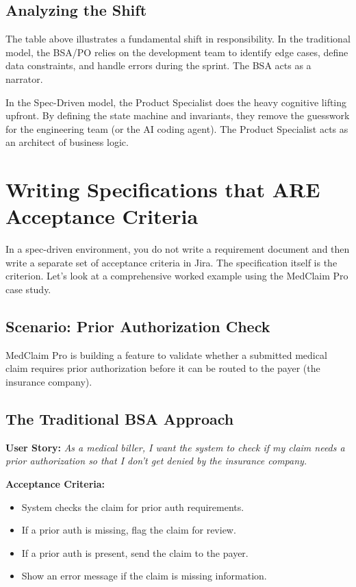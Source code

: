 \subsection{Analyzing the Shift}\label{analyzing-the-shift}

The table above illustrates a fundamental shift in responsibility. In
the traditional model, the BSA/PO relies on the development team to
identify edge cases, define data constraints, and handle errors during
the sprint. The BSA acts as a narrator.

In the Spec-Driven model, the Product Specialist does the heavy
cognitive lifting upfront. By defining the state machine and invariants,
they remove the guesswork for the engineering team (or the AI coding
agent). The Product Specialist acts as an architect of business logic.

\section{Writing Specifications that ARE Acceptance
Criteria}\label{writing-specifications-that-are-acceptance-criteria}

In a spec-driven environment, you do not write a requirement document
and then write a separate set of acceptance criteria in Jira. The
specification itself is the criterion. Let's look at a comprehensive
worked example using the MedClaim Pro case study.

\subsection{Scenario: Prior Authorization
Check}\label{scenario-prior-authorization-check}

MedClaim Pro is building a feature to validate whether a submitted
medical claim requires prior authorization before it can be routed to
the payer (the insurance company).

\subsection{The Traditional BSA
Approach}\label{the-traditional-bsa-approach}

\textbf{User Story:} \emph{As a medical biller, I want the system to
check if my claim needs a prior authorization so that I don't get denied
by the insurance company.}

\textbf{Acceptance Criteria:}

\begin{itemize}
\tightlist
\item
  System checks the claim for prior auth requirements.
\item
  If a prior auth is missing, flag the claim for review.
\item
  If a prior auth is present, send the claim to the payer.
\item
  Show an error message if the claim is missing information.
\end{itemize}

